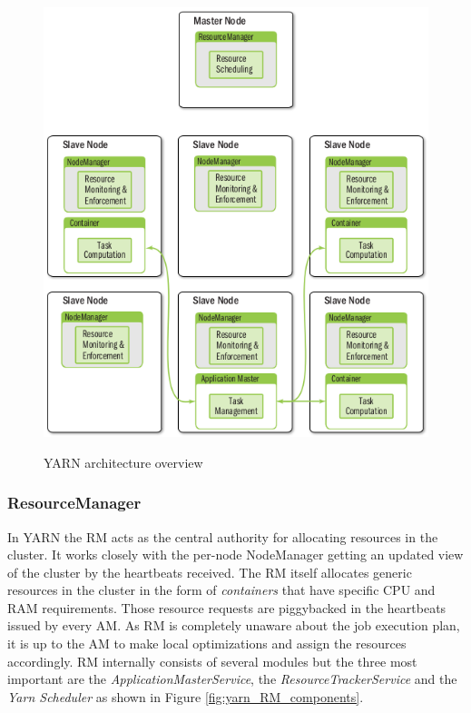 \begin{figure}
\centering
\includegraphics[scale=0.5]{resources/images/Background/yarn_arch_overview.png}
\label{fig:yarn_arch_overview}
\caption{YARN architecture overview \cite{Murthy:2014:AHY:2636998}}
\end{figure}

\subsubsection{ResourceManager}
\label{sssec:rm}
In YARN the RM acts as the central authority for allocating resources
in the cluster. It works closely with the per-node NodeManager getting
an updated view of the cluster by the heartbeats received. The RM
itself allocates generic resources in the cluster in the form of
\emph{containers} that have specific CPU and RAM requirements. Those
resource requests are piggybacked in the heartbeats issued by every AM.
As RM is completely unaware about the job execution plan,
it is up to the AM to make local optimizations and assign the
resources accordingly. RM internally consists of several modules but
the three most important are the \emph{ApplicationMasterService}, the
\emph{ResourceTrackerService} and the \emph{Yarn Scheduler} as shown
in Figure \ref{fig:yarn_RM_components}.

